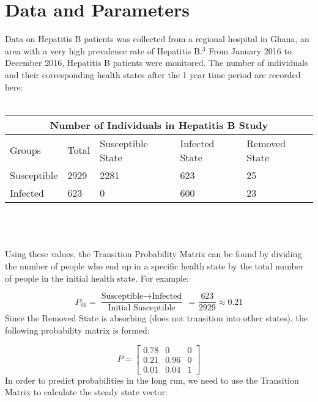 \documentclass{article}
\begin{document}
\section{Data and Parameters}

Data on Hepatitis B patients was collected from a regional hospital in Ghana, an area with a very high prevalence rate of Hepatitis B.$^3$ From January 2016 to December 2016, Hepatitis B patients were monitored. The number of individuals and their corresponding health states after the 1 year time period are recorded here:
\\ \\

\begin{tabular}{ |p{2cm}||p{2cm}|p{2cm}|p{2cm}|p{2cm}|  }
 \hline
 \multicolumn{5}{|c|}{Number of Individuals in Hepatitis B Study} \\
 \hline
 Groups & Total & Susceptible State & Infected State & Removed State\\
 \hline
 Susceptible & 2929 &2281& 623 & 25\\
 \hline
 Infected & 623 & 0 &600 & 23\\
 \hline
\end{tabular}
\\
\\
\\
Using these values, the Transition Probability Matrix can be found by dividing the number of people who end up in a specific health state by the total number of people in the initial health state. For example:

\[ P_{01} = \frac{\text{Susceptible} \longrightarrow \text{Infected} }{\text{Initial Susceptible}} \ \ \textrm{= } \frac{623}{2929} \approx{0.21} \]
Since the Removed State is absorbing (does not transition into other states), the following probability matrix is formed: 

\begin{equation*}
P = 
\begin{bmatrix}
0.78 & 0 & 0 \\
0.21 & 0.96 & 0 \\
0.01 & 0.04 & 1
\end{bmatrix}
\end{equation*}
In order to predict probabilities in the long run, we need to use the Transition Matrix to calculate the steady state vector:
\end{document}
